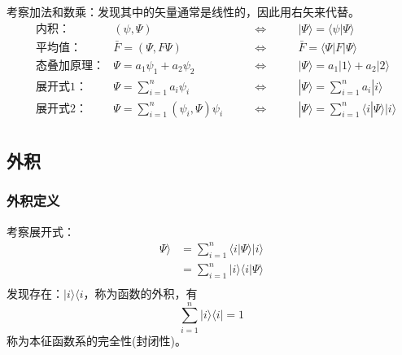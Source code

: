 \begin{frame}
    \frametitle{}
    考察加法和数乘：发现其中的矢量通常是线性的，因此用右矢来代替。\\
    $$\begin{aligned}
    &\text{内积：}   & (\psi,\Psi)  & \qquad\Leftrightarrow \qquad & | \Psi \rangle =\langle \psi | \Psi \rangle \\
    &\text{平均值：}   & \bar{F}=(\Psi,F\Psi)  & \qquad\Leftrightarrow \qquad & \bar{F} =\langle \Psi|F | \Psi \rangle \\
    &\text{态叠加原理：}   & \Psi=a_1 \psi_1+ a_2 \psi_2  & \qquad\Leftrightarrow \qquad &| \Psi \rangle =a_1 |1 \rangle+ a_2 |2 \rangle\\
    &\text{展开式1：}     & \Psi=\sum\limits_{i=1} ^n a_i \psi_i & \qquad \Leftrightarrow \qquad &| \Psi \rangle =\sum\limits_{i=1} ^n a_i |i \rangle\\
    &\text{展开式2：}     & \Psi=\sum\limits_{i=1} ^n (\psi_i ,\Psi) \psi_i & \qquad \Leftrightarrow \qquad &| \Psi \rangle =\sum\limits_{i=1} ^n \langle i | \Psi \rangle |i\rangle\\
    \end{aligned}
    $$
\end{frame} 
 
\subsection{外积}

\begin{frame}
    \frametitle{外积定义}
    考察展开式：
    $$\begin{aligned}
    \Psi \rangle &= \sum\limits_{i=1} ^n \langle i | \Psi \rangle |i\rangle\\
                 &= \sum\limits_{i=1} ^n |i\rangle\langle i | \Psi \rangle \\
    \end{aligned}
    $$
    发现存在：$|i\rangle\langle i$，称为函数的外积，有
    \[\sum\limits_{i=1} ^n |i\rangle\langle i |=1\]
    称为本征函数系的完全性(封闭性)。 
\end{frame} 

